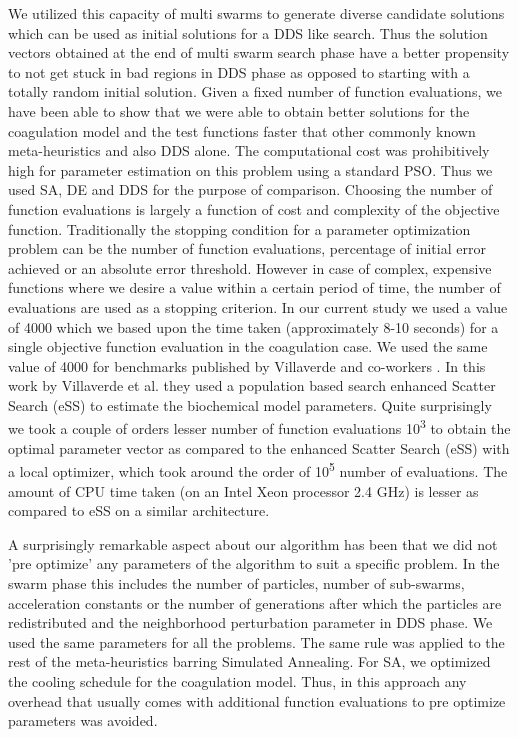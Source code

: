 \documentclass[12pt]{article}
\begin{document}
We utilized this capacity of multi swarms to generate diverse candidate solutions which can be used as initial solutions for a DDS like search. Thus the solution vectors obtained at the end of multi swarm search phase have a better propensity to not get stuck in bad regions in DDS phase as opposed to starting with a totally random initial solution. Given a fixed number of function evaluations, we have been able to show that we were able to obtain better solutions for the coagulation model and the test functions faster that other commonly known meta-heuristics and also DDS alone. The computational cost was prohibitively high for parameter estimation on this problem using a standard PSO. Thus we used SA, DE and DDS for the purpose of comparison.
 Choosing the number of function evaluations is largely a function of cost and complexity of the objective function. Traditionally the stopping condition for a parameter optimization problem can be the number of function evaluations, percentage of initial error achieved or an absolute error threshold. However in case of complex, expensive functions where we desire a value within a certain period of time, the number of evaluations are used as a stopping criterion. In our current study we used a value of 4000 which we based upon the time taken (approximately 8-10 seconds) for a single objective function evaluation in the coagulation case. We used the same value of 4000 for benchmarks published by Villaverde and co-workers \cite{villaverde2015biopredyn}. In this work by Villaverde et al. they used a population based search enhanced Scatter Search (eSS) to estimate the biochemical model parameters. Quite surprisingly we took a couple of orders lesser number of function evaluations 10\textsuperscript{3} to obtain the optimal parameter vector as compared to the enhanced Scatter Search (eSS) with a local optimizer, which took around the order of 10\textsuperscript{5} number of evaluations.  The amount of CPU time taken (on an Intel Xeon processor 2.4 GHz) is lesser as compared to eSS on a similar architecture.

A surprisingly remarkable aspect about our algorithm has been that we did not 'pre optimize' any parameters of the algorithm to suit a specific problem. In the swarm phase this includes the number of particles, number of sub-swarms, acceleration constants or the number of generations after which the particles are redistributed and the neighborhood perturbation parameter in DDS phase. We used the same parameters for all the problems. The same rule was applied to the rest of the meta-heuristics barring Simulated Annealing. For SA, we optimized the cooling schedule for the coagulation model. Thus, in this approach any overhead that usually comes with additional function evaluations to pre optimize parameters was avoided.
\end{document}
